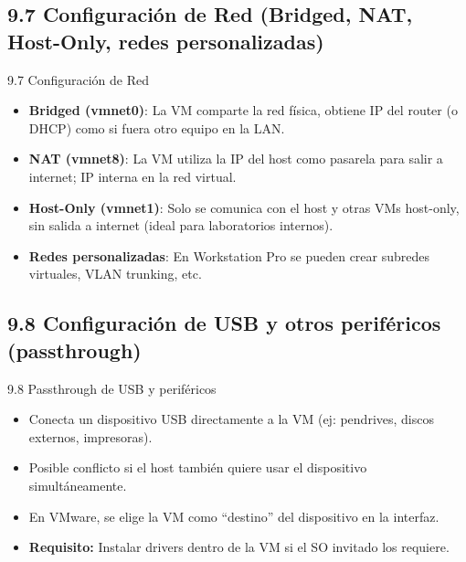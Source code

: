 \documentclass{beamer}
\begin{document}
\subsection{9.7 Configuración de Red (Bridged, NAT, Host-Only, redes personalizadas)}
\begin{frame}{9.7 Configuración de Red}
	\begin{itemize}
		\item \textbf{Bridged (vmnet0)}: La VM comparte la red física, obtiene IP del router (o DHCP) como si fuera otro equipo en la LAN.
		\item \textbf{NAT (vmnet8)}: La VM utiliza la IP del host como pasarela para salir a internet; IP interna en la red virtual.
		\item \textbf{Host-Only (vmnet1)}: Solo se comunica con el host y otras VMs host-only, sin salida a internet (ideal para laboratorios internos).
		\item \textbf{Redes personalizadas}: En Workstation Pro se pueden crear subredes virtuales, VLAN trunking, etc.
	\end{itemize}
\end{frame}

\subsection{9.8 Configuración de USB y otros periféricos (passthrough)}
\begin{frame}{9.8 Passthrough de USB y periféricos}
	\begin{itemize}
		\item Conecta un dispositivo USB directamente a la VM (ej: pendrives, discos externos, impresoras).
		\item Posible conflicto si el host también quiere usar el dispositivo simultáneamente.
		\item En VMware, se elige la VM como “destino” del dispositivo en la interfaz.
		\item \textbf{Requisito:} Instalar drivers dentro de la VM si el SO invitado los requiere.
	\end{itemize}
\end{frame}

\end{document}
